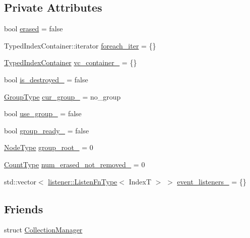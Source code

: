 \subsection*{Private Attributes}
\begin{DoxyCompactItemize}
\item 
bool \hyperlink{structvt_1_1vrt_1_1collection_1_1_holder_a2d053dab199764dce3029b8a55cbf1cc}{erased} = false
\item 
Typed\+Index\+Container\+::iterator \hyperlink{structvt_1_1vrt_1_1collection_1_1_holder_a1b21c6d5b8b0bce316afe9b60e80d621}{foreach\+\_\+iter} = \{\}
\item 
\hyperlink{structvt_1_1vrt_1_1collection_1_1_holder_ae8d4ff940c971d52b237cf4d6049380a}{Typed\+Index\+Container} \hyperlink{structvt_1_1vrt_1_1collection_1_1_holder_ad41ddb379b9d88253ea822e5261fb541}{vc\+\_\+container\+\_\+} = \{\}
\item 
bool \hyperlink{structvt_1_1vrt_1_1collection_1_1_holder_a862e7f99e626f9ea11de83b635466cab}{is\+\_\+destroyed\+\_\+} = false
\item 
\hyperlink{namespacevt_a27b5e4411c9b6140c49100e050e2f743}{Group\+Type} \hyperlink{structvt_1_1vrt_1_1collection_1_1_holder_a7627f2411c3d19bc070e85b71b1f9fff}{cur\+\_\+group\+\_\+} = no\+\_\+group
\item 
bool \hyperlink{structvt_1_1vrt_1_1collection_1_1_holder_ac897fcc83ba066a30cbf7b81e0283a1f}{use\+\_\+group\+\_\+} = false
\item 
bool \hyperlink{structvt_1_1vrt_1_1collection_1_1_holder_ad4041accaac66318b6ddc027f9730d32}{group\+\_\+ready\+\_\+} = false
\item 
\hyperlink{namespacevt_a866da9d0efc19c0a1ce79e9e492f47e2}{Node\+Type} \hyperlink{structvt_1_1vrt_1_1collection_1_1_holder_a2809b2adf064822eeab947991e8f12d3}{group\+\_\+root\+\_\+} = 0
\item 
\hyperlink{structvt_1_1vrt_1_1collection_1_1_holder_a3251a556ac19fc7dc4d0bd388cfaedeb}{Count\+Type} \hyperlink{structvt_1_1vrt_1_1collection_1_1_holder_ac6e747cb66d6f44f78c28448a59d8a0a}{num\+\_\+erased\+\_\+not\+\_\+removed\+\_\+} = 0
\item 
std\+::vector$<$ \hyperlink{namespacevt_1_1vrt_1_1collection_1_1listener_a62d04c44a3c187eae66bdba2090b4505}{listener\+::\+Listen\+Fn\+Type}$<$ IndexT $>$ $>$ \hyperlink{structvt_1_1vrt_1_1collection_1_1_holder_aebf918fdc3e2ae3b4cf20a1ceb1a6acf}{event\+\_\+listeners\+\_\+} = \{\}
\end{DoxyCompactItemize}
\subsection*{Friends}
\begin{DoxyCompactItemize}
\item 
struct \hyperlink{structvt_1_1vrt_1_1collection_1_1_holder_af9288b1963f434a90b307b5305a49510}{Collection\+Manager}
\end{DoxyCompactItemize}


